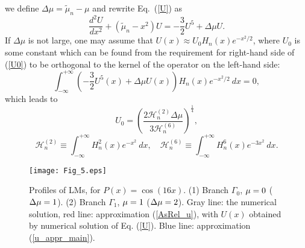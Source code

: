 \documentclass[aps,preprint,showkeys,
]{revtex4}
\begin{document}
we define $\Delta \mu =\tilde{\mu}_{n}-\mu $ and rewrite Eq.~(\ref{U}) as
\begin{equation}
\frac{d^{2}U}{dx^{2}}+(\tilde{\mu}_{n}-x^{2})U=-\frac{3}{2}U^{5}+\Delta \mu
U.  \label{U0}
\end{equation}%
If $\Delta \mu $ is not large, one may assume that $U(x)\approx
U_{0}H_{n}(x)e^{-x^{2}/2}$, where $U_{0}$ is some constant which can be
found from the requirement for right-hand side of (\ref{U0}) to be
orthogonal to the kernel of the operator on the left-hand side:
\begin{equation}
\int_{-\infty }^{+\infty }\left( -\frac{3}{2}U^{5}(x)+\Delta \mu U(x)\right)
H_{n}(x)e^{-x^{2}/2}~dx=0,  \label{Orthog}
\end{equation}%
which leads to
\begin{equation}
U_{0}=\left( \frac{2{\mathcal{H}}_{n}^{(2)}\Delta \mu }{3{\mathcal{H}}%
_{n}^{(6)}}\right) ^{\frac{1}{4}},  \label{Q_0_formula}
\end{equation}%
\begin{equation}
{\mathcal{H}}_{n}^{(2)}\equiv \int_{-\infty }^{+\infty
}H_{n}^{2}(x)e^{-x^{2}}~dx,\quad {\mathcal{H}}_{n}^{(6)}\equiv \int_{-\infty
}^{+\infty }H_{n}^{6}(x)e^{-3x^{2}}~dx.
\end{equation}

\begin{figure}[tbp]
\texttt{[image: Fig\_5.eps]}%
\caption{Profiles of LMs, for $P(x)=\cos \left( 16x\right) $. (1) Branch $%
\Gamma _{0}$, $\protect\mu =0$ ($\Delta \protect\mu =1$). (2) Branch $\Gamma
_{1}$, $\protect\mu =1$ ($\Delta \protect\mu =2$). Gray line: the numerical
solution, red line: approximation (\protect\ref{AsRel_u}), with $U(x)$
obtained by numerical solution of Eq. (\protect\ref{U}). Blue line:
approximation (\protect\ref{u_appr_main}). }
\label{Fig:Prof}
\end{figure}
\end{document}

